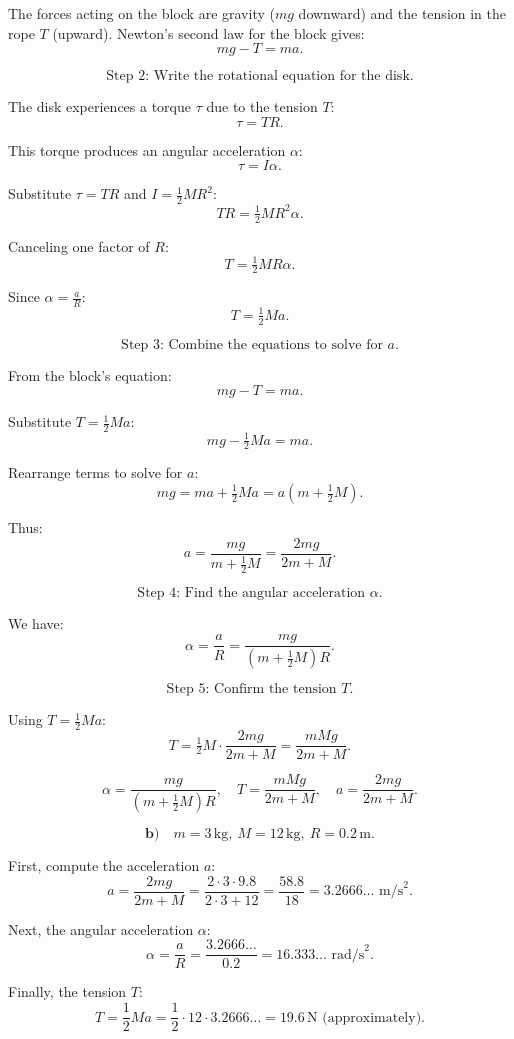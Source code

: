 \documentclass{article}
\begin{document}
The forces acting on the block are gravity (\(mg\) downward) and the tension in the rope \(T\) (upward). Newton’s second law for the block gives:
\[
mg - T = ma.
\]

\[
\text{Step 2: Write the rotational equation for the disk.}
\]

The disk experiences a torque \(\tau\) due to the tension \(T\):
\[
\tau = T R.
\]

This torque produces an angular acceleration \(\alpha\):
\[
\tau = I \alpha.
\]

Substitute \(\tau = TR\) and \(I = \tfrac{1}{2}MR^2\):
\[
T R = \tfrac{1}{2} M R^2 \alpha.
\]

Canceling one factor of \(R\):
\[
T = \tfrac{1}{2} M R \alpha.
\]

Since \(\alpha = \tfrac{a}{R}\):
\[
T = \tfrac{1}{2} M a.
\]

\[
\text{Step 3: Combine the equations to solve for } a.
\]

From the block’s equation:
\[
mg - T = ma.
\]

Substitute \(T = \tfrac{1}{2} M a\):
\[
mg - \tfrac{1}{2} M a = ma.
\]

Rearrange terms to solve for \(a\):
\[
mg = ma + \tfrac{1}{2} M a = a \left(m + \tfrac{1}{2} M \right).
\]

Thus:
\[
a = \frac{mg}{m + \tfrac{1}{2} M} = \frac{2mg}{2m + M}.
\]

\[
\text{Step 4: Find the angular acceleration } \alpha.
\]

We have:
\[
\alpha = \frac{a}{R} = \frac{m g}{(m + \tfrac{1}{2} M) R}.
\]

\[
\text{Step 5: Confirm the tension } T.
\]

Using \(T = \tfrac{1}{2} M a\):
\[
T = \tfrac{1}{2}M \cdot \frac{2mg}{2m + M} = \frac{mM g}{2m + M}.
\]

\[
\boxed{\alpha = \frac{mg}{(m+\tfrac{1}{2} M)R}, \quad T = \frac{mM g}{2m + M}, \quad a = \frac{2mg}{2m + M}.}
\]

\[
\textbf{b)} \quad m = 3\,\text{kg}, \ M = 12\,\text{kg}, \ R = 0.2\,\text{m}.
\]

First, compute the acceleration \(a\):
\[
a = \frac{2 m g}{2 m + M} = \frac{2 \cdot 3 \cdot 9.8}{2 \cdot 3 + 12} = \frac{58.8}{18} = 3.2666\ldots \text{ m/s}^2.
\]

Next, the angular acceleration \(\alpha\):
\[
\alpha = \frac{a}{R} = \frac{3.2666\ldots}{0.2} = 16.333\ldots \text{ rad/s}^2.
\]

Finally, the tension \(T\):
\[
T = \frac{1}{2} M a = \frac{1}{2} \cdot 12 \cdot 3.2666\ldots = 19.6\,\text{N (approximately)}.
\]
\end{document}
